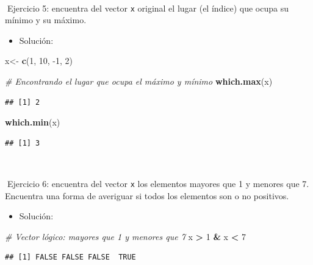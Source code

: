 \documentclass[11pt,]{book}
\newenvironment{Shaded}{\begin{snugshade}}{\end{snugshade}}
\newcommand{\CommentTok}[1]{\textcolor[rgb]{0.37,0.37,0.37}{\textit{#1}}}
\newcommand{\DecValTok}[1]{\textcolor[rgb]{0.06,0.06,0.06}{#1}}
\newcommand{\KeywordTok}[1]{\textcolor[rgb]{0.27,0.27,0.27}{\textbf{#1}}}
\newcommand{\NormalTok}[1]{#1}
\newcommand{\OperatorTok}[1]{\textcolor[rgb]{0.43,0.43,0.43}{\textbf{#1}}}
\newcommand{\StringTok}[1]{\textcolor[rgb]{0.5,0.5,0.5}{#1}}
\providecommand{\tightlist}{%
  \setlength{\itemsep}{0pt}\setlength{\parskip}{0pt}}
\begin{document}
~

📝Ejercicio 5: encuentra del vector \texttt{x} original el lugar (el índice) que ocupa su mínimo y su máximo.

\begin{itemize}
\tightlist
\item
  Solución:
\end{itemize}

\begin{Shaded}
\begin{Highlighting}[]
\NormalTok{x<-}\StringTok{ }\KeywordTok{c}\NormalTok{(}\DecValTok{1}\NormalTok{, }\DecValTok{10}\NormalTok{, }\DecValTok{-1}\NormalTok{, }\DecValTok{2}\NormalTok{)}

\CommentTok{# Encontrando el lugar que ocupa el máximo y mínimo}
\KeywordTok{which.max}\NormalTok{(x)}
\end{Highlighting}
\end{Shaded}

\begin{verbatim}
## [1] 2
\end{verbatim}

\begin{Shaded}
\begin{Highlighting}[]
\KeywordTok{which.min}\NormalTok{(x)}
\end{Highlighting}
\end{Shaded}

\begin{verbatim}
## [1] 3
\end{verbatim}

~

📝Ejercicio 6: encuentra del vector \texttt{x} los elementos mayores que 1 y menores que 7. Encuentra una forma de averiguar si todos los elementos son o no positivos.

\begin{itemize}
\tightlist
\item
  Solución:
\end{itemize}

\begin{Shaded}
\begin{Highlighting}[]
\CommentTok{# Vector lógico: mayores que 1 y menores que 7}
\NormalTok{x }\OperatorTok{>}\StringTok{ }\DecValTok{1} \OperatorTok{&}\StringTok{ }\NormalTok{x }\OperatorTok{<}\StringTok{ }\DecValTok{7}
\end{Highlighting}
\end{Shaded}

\begin{verbatim}
## [1] FALSE FALSE FALSE  TRUE
\end{verbatim}
\end{document}
